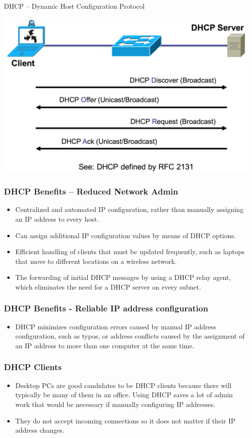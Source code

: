 \documentclass[pdflatex,compress,mathserif]{beamer}
\begin{document}
\begin{frame}{DHCP – Dynamic Host Configuration Protocol}
	\begin{center}
		\includegraphics[width=0.8\linewidth]{img/img02}
	\end{center}
\end{frame}

\begin{frame}
	\frametitle{DHCP Benefits – Reduced Network Admin}
	\begin{itemize}
		\item Centralized and automated IP configuration, rather than manually
assigning an IP address to every host.
		\item Can assign additional IP configuration values by means of DHCP
options.
		\item Efficient handling of clients that must be updated frequently, such as
laptops that move to different locations on a wireless network.
		\item The forwarding of initial DHCP messages by using a DHCP relay agent,
which eliminates the need for a DHCP server on every subnet.
	\end{itemize}
\end{frame}

\begin{frame}
	\frametitle{DHCP Benefits - Reliable IP address configuration}
	\begin{itemize}
		\item DHCP minimizes configuration errors caused by manual IP address
configuration, such as typos, or address conflicts caused by the
assignment of an IP address to more than one computer at the same
time.
	\end{itemize}
\end{frame}

\begin{frame}
	\frametitle{DHCP Clients}
	\begin{itemize}
		\item Desktop PCs are good candidates to be DHCP clients because there will
typically be many of them in an office. Using DHCP saves a lot of admin
work that would be necessary if manually configuring IP addresses.
		\item They do not accept incoming connections so it does not matter if their
IP address changes.
	\end{itemize}
\end{frame}
\end{document}
